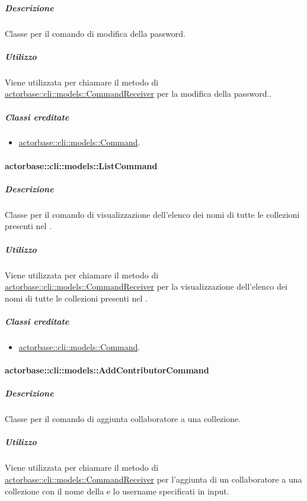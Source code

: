 \documentclass{scalatekids-article}
\begin{document}
\subparagraph{Descrizione}

Classe per il comando di modifica della password.

\subparagraph{Utilizzo}

Viene utilizzata per chiamare il metodo di
\hyperref[sec:actorbase::cli::models::CommandReceiver]{actorbase::cli::models::CommandReceiver} per la modifica della password..

\subparagraph{Classi ereditate}

\begin{itemize}
\item \hyperref[sec:actorbase::cli::models::Command]{actorbase::cli::models::Command}.
\end{itemize}

\paragraph{actorbase::cli::models::ListCommand}
\label{sec:actorbase::cli::models::ListCommand}

\subparagraph{Descrizione}

Classe per il comando di visualizzazione dell'elenco dei nomi di tutte le
collezioni presenti nel .

\subparagraph{Utilizzo}

Viene utilizzata per chiamare il metodo di
\hyperref[sec:actorbase::cli::models::CommandReceiver]{actorbase::cli::models::CommandReceiver} per la visualizzazione dell'elenco dei
nomi di tutte le collezioni presenti nel .

\subparagraph{Classi ereditate}

\begin{itemize}
\item \hyperref[sec:actorbase::cli::models::Command]{actorbase::cli::models::Command}.
\end{itemize}

\paragraph{actorbase::cli::models::AddContributorCommand}
\label{sec:actorbase::cli::models::AddContributorCommand}

\subparagraph{Descrizione}

Classe per il comando di aggiunta collaboratore a una collezione.

\subparagraph{Utilizzo}

Viene utilizzata per chiamare il metodo di
\hyperref[sec:actorbase::cli::models::CommandReceiver]{actorbase::cli::models::CommandReceiver} per l'aggiunta di un collaboratore a
una collezione con il nome della  e lo username specificati
in input.
\end{document}
